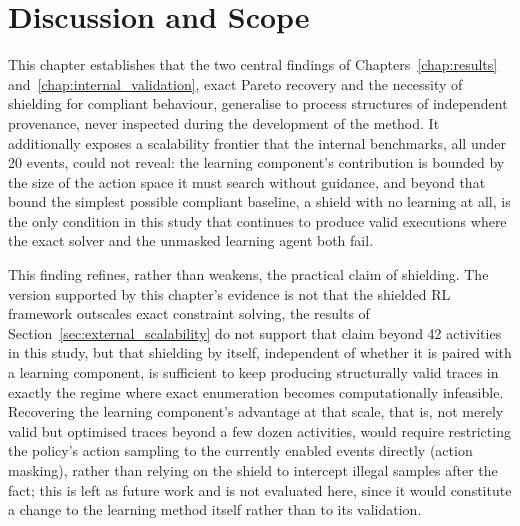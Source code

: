 \section{Discussion and Scope}
\label{sec:external_discussion}

This chapter establishes that the two central findings of
Chapters~\ref{chap:results} and~\ref{chap:internal_validation}, exact
Pareto recovery and the necessity of shielding for compliant behaviour,
generalise to process structures of independent provenance, never
inspected during the development of the method. It additionally
exposes a scalability frontier that the internal benchmarks, all under
20 events, could not reveal: the learning component's contribution is
bounded by the size of the action space it must search without
guidance, and beyond that bound the simplest possible compliant
baseline, a shield with no learning at all, is the only condition in
this study that continues to produce valid executions where the exact
solver and the unmasked learning agent both fail.

This finding refines, rather than weakens, the practical claim of
shielding. The version supported by this chapter's evidence is not
that the shielded \ac{RL} framework outscales exact constraint solving,
the results of Section~\ref{sec:external_scalability} do not support
that claim beyond 42 activities in this study, but that shielding by
itself, independent of whether it is paired with a learning component,
is sufficient to keep producing structurally valid traces in exactly
the regime where exact enumeration becomes computationally infeasible.
Recovering the learning component's advantage at that scale, that is,
not merely valid but optimised traces beyond a few dozen activities,
would require restricting the policy's action sampling to the
currently enabled events directly (action masking), rather than relying
on the shield to intercept illegal samples after the fact; this is left
as future work and is not evaluated here, since it would constitute a
change to the learning method itself rather than to its validation.

